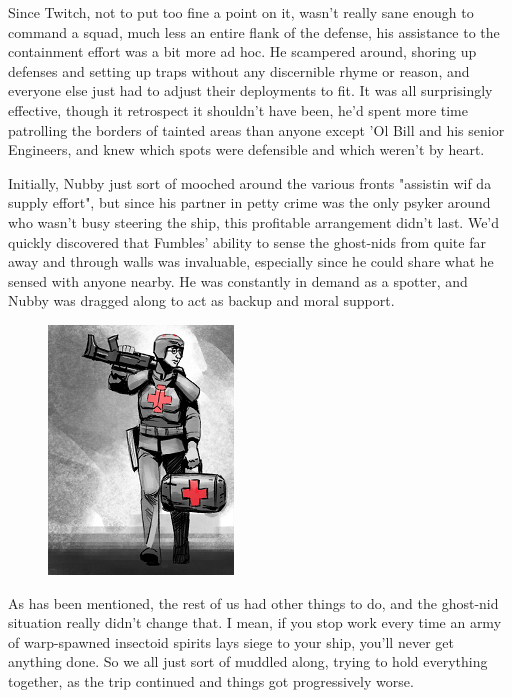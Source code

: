 Since Twitch, not to put too fine a point on it, wasn't really sane enough to command a squad, much less an entire flank of the defense, his assistance to the containment effort was a bit more ad hoc. 
He scampered around, shoring up defenses and setting up traps without any discernible rhyme or reason, and everyone else just had to adjust their deployments to fit. 
It was all surprisingly effective, though it retrospect it shouldn't have been, he'd spent more time patrolling the borders of tainted areas than anyone except 'Ol Bill and his senior Engineers, and knew which spots were defensible and which weren't by heart.

Initially, Nubby just sort of mooched around the various fronts "assistin wif da supply effort", but since his partner in petty crime was the only psyker around who wasn't busy steering the ship, this profitable arrangement didn't last. 
We'd quickly discovered that Fumbles' ability to sense the ghost-nids from quite far away and through walls was invaluable, especially since he could share what he sensed with anyone nearby. 
He was constantly in demand as a spotter, and Nubby was dragged along to act as backup and moral support.

\begin{figure}
	\begin{center}
		\includegraphics[width=\figwidth]{pics/15/16.png}
	\end{center}
\end{figure}
As has been mentioned, the rest of us had other things to do, and the ghost-nid situation really didn't change that. 
I mean, if you stop work every time an army of warp-spawned insectoid spirits lays siege to your ship, you'll never get anything done. 
So we all just sort of muddled along, trying to hold everything together, as the trip continued and things got progressively worse.

